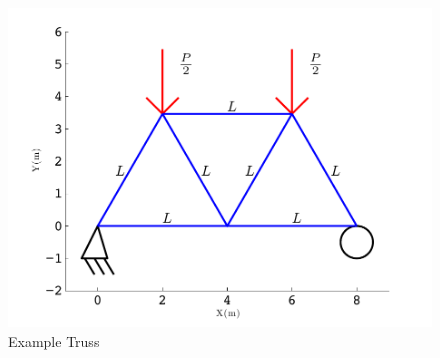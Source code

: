 \documentclass[12pt]{article}
\begin{document}
\begin{figure}[htb!]
	\begin{center}
		\includegraphics[width=1\textwidth]{TrussFS}
	\end{center}
	\caption{Example Truss}
	\label{fig:Example}
\end{figure}
\end{document}
